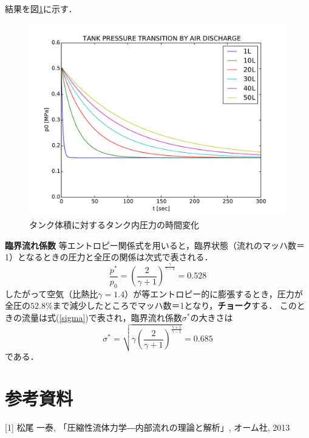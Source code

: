 \documentclass{jsarticle}
\begin{document}
結果を図\ref{fig:result}に示す．
\begin{figure}[htbp]
 \centering
 \includegraphics[width=150mm]{result.pdf}
 \caption{タンク体積に対するタンク内圧力の時間変化}
 \label{fig:result}
\end{figure}


\begin{itembox}[l]{\bf{臨界流れ係数}}
等エントロピー関係式を用いると，臨界状態（流れのマッハ数＝1）となるときの圧力と全圧の関係は次式で表される．
\[
  \frac{p^{{*}}}{p_{0}}= \left( \frac{2}{\gamma+1}\right)^{\frac{\gamma}{\gamma-1}} = 0.528
\]
したがって空気（比熱比$\gamma = 1.4$）が等エントロピー的に膨張するとき，圧力が全圧の$52.8$\%まで減少したところでマッハ数＝1となり，{\bf チョーク}する．
このときの流量は式(\ref{sigma})で表され，臨界流れ係数$\sigma^{*}$の大きさは
\[
\sigma^{{*}}=\sqrt {\gamma \left( \frac{2}{\gamma + 1} \right) ^{\frac{\gamma+1}{\gamma - 1}}} = 0.685
\]
である．
\end{itembox}

\section{参考資料}
[1] 松尾 一泰, 「圧縮性流体力学―内部流れの理論と解析」, オーム社, 2013
\end{document}
